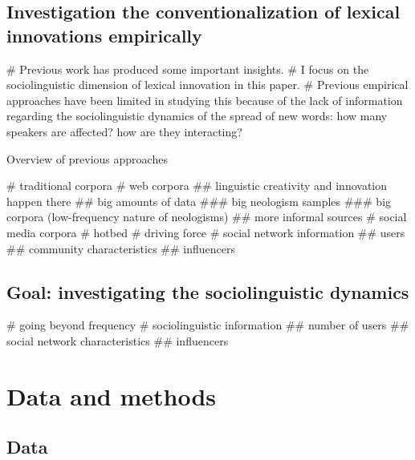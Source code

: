 \documentclass[
  a4paper,
  ]{scrartcl}
\begin{document}
  \subsection{Investigation the conventionalization of lexical innovations empirically}

    \begin{easylist}[itemize]
      # Previous work has produced some important insights.
      # I focus on the sociolinguistic dimension of lexical innovation in this paper.
      # Previous empirical approaches have been limited in studying this because of the lack of information regarding the sociolinguistic dynamics of the spread of new words: how many speakers are affected? how are they interacting?
    \end{easylist}

    Overview of previous approaches

      \begin{easylist}[itemize]
        # traditional corpora \parencite{Elsen2004}
        # web corpora \cite{Renouf2006,Kerremans2012}
          ## linguistic creativity and innovation happen there
          ## big amounts of data
            ### big neologism samples
            ### big corpora (low-frequency nature of neologisms)
          ## more informal sources
        # social media corpora \cite{Grieve2016,Eisenstein2014}
          # hotbed
          # driving force
          # social network information
            ## users
            ## community characteristics
            ## influencers
      \end{easylist}

  \subsection{Goal: investigating the sociolinguistic dynamics}

    \begin{easylist}[itemize]
      # going beyond frequency
      # sociolinguistic information
        ## number of users
        ## social network characteristics
        ## influencers
    \end{easylist}

\section{Data and methods}

  \subsection{Data}
\end{document}

